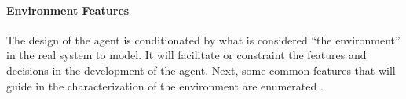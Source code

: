 \documentclass[11pt,oneside,a4paper,openright]{report}
\begin{document}




\paragraph{Environment Features}

The design of the agent is conditionated by what is considered ``the environment'' in the real system to model.
It will facilitate or constraint the features and decisions in the development of the agent. Next, some common features that will guide in the characterization of the environment are enumerated \cite[section 2.3]{RussellNorvig}.
\end{document}
